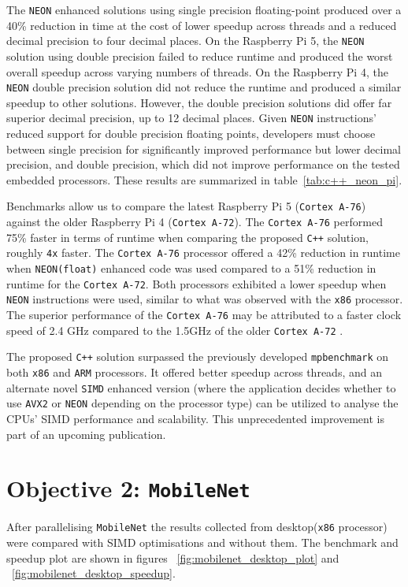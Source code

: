 The \texttt{NEON} enhanced solutions using single precision floating-point produced over a 40\% reduction in time at the cost of lower speedup across threads and a reduced decimal precision to four decimal places. On the Raspberry Pi 5, the \texttt{NEON} solution using double precision failed to reduce runtime and produced the worst overall speedup across varying numbers of threads. On the Raspberry Pi 4, the \texttt{NEON} double precision solution did not reduce the runtime and produced a similar speedup to other solutions. However, the double precision solutions did offer far superior decimal precision, up to 12 decimal places. Given \texttt{NEON} instructions' reduced support for double precision floating points, developers must choose between single precision for significantly improved performance but lower decimal precision, and double precision, which did not improve performance on the tested embedded processors. These results are summarized in table~\ref{tab:c++_neon_pi}.

Benchmarks allow us to compare the latest Raspberry Pi 5 (\texttt{Cortex A-76}) against the older Raspberry Pi 4 (\texttt{Cortex A-72}). The \texttt{Cortex A-76} performed 75\% faster in terms of runtime when comparing the proposed \texttt{C++} solution, roughly \texttt{4x} faster. The \texttt{Cortex A-76} processor offered a 42\% reduction in runtime when \texttt{NEON(float)} enhanced code was used compared to a 51\% reduction in runtime for the \texttt{Cortex A-72}. Both processors exhibited a lower speedup when \texttt{NEON} instructions were used, similar to what was observed with the \texttt{x86} processor. The superior performance of the \texttt{Cortex A-76} may be attributed to a faster clock speed of 2.4 GHz compared to the 1.5GHz of the older \texttt{Cortex A-72} \cite{rasp_pi5_pi4_comparision}.

The proposed \texttt{C++} solution surpassed the previously developed \texttt{mpbenchmark}\cite{mpbenchmark_paper} on both \texttt{x86} and \texttt{ARM} processors. It offered better speedup across threads, and an alternate novel \texttt{SIMD} enhanced version (where the application decides whether to use \texttt{AVX2} or \texttt{NEON} depending on the processor type) can be utilized to analyse the CPUs' SIMD performance and scalability. This unprecedented improvement is part of an upcoming publication.

\section{Objective 2: \texttt{MobileNet}}
After parallelising \texttt{MobileNet} the results collected from desktop(\texttt{x86} processor) were compared with SIMD optimisations and without them. The benchmark and speedup plot are shown in figures ~\ref{fig:mobilenet_desktop_plot} and ~\ref{fig:mobilenet_desktop_speedup}. 

